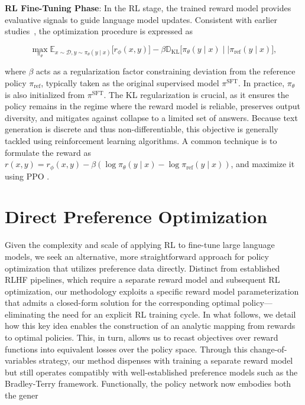 \textbf{RL Fine-Tuning Phase}: In the RL stage, the trained reward model provides evaluative signals to guide language model updates. Consistent with earlier studies~\citep{jaques2017sequence, jaques2020human}, the optimization procedure is expressed as

\begin{equation}\label{eq:RL}
\max_{\pi_{\theta}}  \mathbb{E}_{x\sim \mathcal{D}, y\sim \pi_{\theta}(y \mid x)}\bigl[r_{\phi}(x, y)\bigr] - \beta\mathbb{D}_{\textrm{KL}}\bigl[\pi_{\theta}(y\mid x)\mid \mid \pi_\text{ref}(y\mid x)\bigr],
\end{equation}

where $\beta$ acts as a regularization factor constraining deviation from the reference policy $\pi_\text{ref}$, typically taken as the original supervised model $\pi^\text{SFT}$. In practice, $\pi_\theta$ is also initialized from $\pi^\text{SFT}$. The KL regularization is crucial, as it ensures the policy remains in the regime where the reward model is reliable, preserves output diversity, and mitigates against collapse to a limited set of answers. Because text generation is discrete and thus non-differentiable, this objective is generally tackled using reinforcement learning algorithms. A common technique \citep{ziegler2020finetuning, stiennon2022learning, bai2022training, ouyang2022training} is to formulate the reward as ${r(x, y) = r_{\phi}(x, y) -\beta (\log \pi_{\theta}(y\mid x) - \log \pi_\text{ref}(y\mid x))}$, and maximize it using PPO \cite{schulman2017proximal}.

\section{Direct Preference Optimization}\label{sec:DPO}

Given the complexity and scale of applying RL to fine-tune large language models, we seek an alternative, more straightforward approach for policy optimization that utilizes preference data directly. Distinct from established RLHF pipelines, which require a separate reward model and subsequent RL optimization, our methodology exploits a specific reward model parameterization that admits a closed-form solution for the corresponding optimal policy—eliminating the need for an explicit RL training cycle. In what follows, we detail how this key idea enables the construction of an analytic mapping from rewards to optimal policies. This, in turn, allows us to recast objectives over reward functions into equivalent losses over the policy space. Through this change-of-variables strategy, our method dispenses with training a separate reward model but still operates compatibly with well-established preference models such as the Bradley-Terry framework. Functionally, the policy network now embodies both the gener

